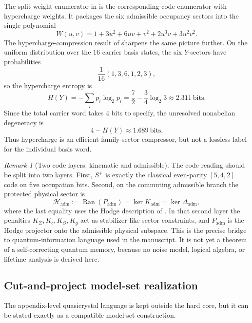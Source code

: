 \documentclass[11pt,a4paper]{article}
\theoremstyle{definition}
\theoremstyle{remark}
\newtheorem*{remark}{Remark}
\newcommand{\Kadm}{K_{\mathrm{adm}}}
\newcommand{\Padm}{P_{\mathrm{adm}}}
\begin{document}
The split weight enumerator in  is the corresponding code enumerator with hypercharge weights. It packages the six admissible occupancy sectors into the single polynomial
\[
W(u,v)
=
1+3u^2+6uv+v^2+2u^3v+3u^2v^2.
\]
The hypercharge-compression result of  sharpens the same picture further. On the uniform distribution over the $16$ carrier basis states, the six $Y$-sectors have probabilities
\[
\frac1{16}(1,3,6,1,2,3),
\]
so the hypercharge entropy is
\[
H(Y)
=
-\sum_i p_i\log_2 p_i
=
\frac72-\frac34\log_2 3
\approx
\num{2.311}\ \text{bits}.
\]
Since the total carrier word takes $4$ bits to specify, the unresolved nonabelian degeneracy is
\[
4-H(Y)\approx \num{1.689}\ \text{bits}.
\]
Thus hypercharge is an efficient family-sector compressor, but not a lossless label for the individual basis word.

\begin{remark}[Two code layers: kinematic and admissible]
The code reading should be split into two layers. First, $S^+$ is exactly the classical even-parity $[5,4,2]$ code on five occupation bits. Second, on the commuting admissible branch the protected physical sector is
\[
\mathcal H_{\mathrm{adm}}
:=
\operatorname{Ran}(\Padm)
=
\ker \Kadm
=
\ker \Delta_{\mathrm{adm}},
\]
where the last equality uses the Hodge description of . In that second layer the penalties $K_\Sigma,K_c,K_\Theta,K_g$ act as stabilizer-like sector constraints, and $\Padm$ is the Hodge projector onto the admissible physical subspace. This is the precise bridge to quantum-information language used in the manuscript. It is not yet a theorem of a self-correcting quantum memory, because no noise model, logical algebra, or lifetime analysis is derived here.
\end{remark}

\subsection{Cut-and-project model-set realization}

The appendix-level quasicrystal language is kept outside the hard core, but it can be stated
exactly as a compatible model-set construction.
\end{document}
